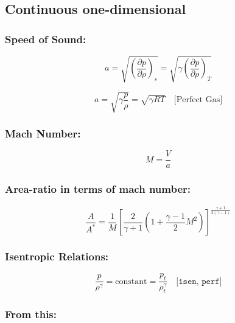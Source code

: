 \subsection*{Continuous one-dimensional}

\subsubsection*{Speed of Sound:}

\begin{equation}
	a = \sqrt{\left( \frac{\partial p}{\partial \rho} \right)_s} = \sqrt{\gamma \left( \frac{\partial p}{\partial \rho} \right)_T}
\end{equation}

\begin{equation}
	a = \sqrt{\gamma \frac{p}{\rho}} = \sqrt{\gamma RT} \quad \text{[Perfect Gas]}
\end{equation}

\subsubsection*{Mach Number:}

\begin{equation}
	M = \frac{V}{a}
\end{equation}

\subsubsection*{Area-ratio in terms of mach number:}
\begin{equation}
	\frac{A}{A^*} = \frac{1}{M} \left[ \frac{2}{\gamma + 1} \left( 1 + \frac{\gamma - 1}{2} M^2 \right) \right]^{\frac{\gamma + 1}{2(\gamma - 1)}}
	\label{eq:area_ratio_mach}
\end{equation}
\subsubsection*{Isentropic Relations:}

\begin{equation}
	\frac{p}{\rho^\gamma} = \text{constant} = \frac{p_t}{\rho_t^\gamma} \quad \texttt{[isen, perf]}
\end{equation}

\subsubsection*{From this:}

